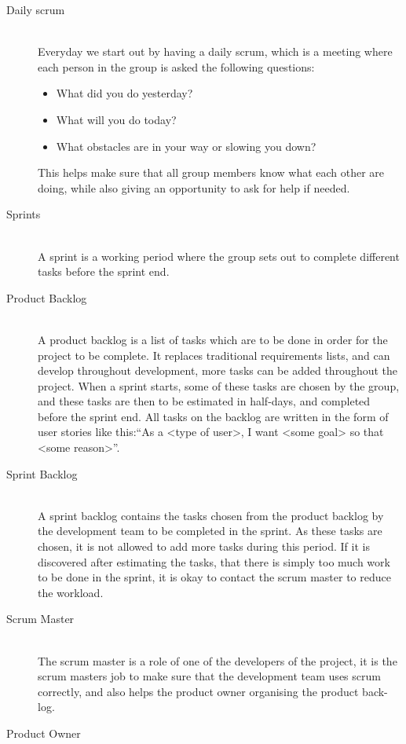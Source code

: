\begin{description}
	\item[Daily scrum] \hfill \\
	Everyday we start out by having a daily scrum, which is a meeting where each person in the group is asked the following questions:
		\begin{itemize}
		    \item What did you do yesterday? 
			\item What will you do today?
			\item What obstacles are in your way or slowing you down?		
		\end{itemize}
		This helps make sure that all group members know what each other are doing, while also giving an opportunity to ask for help if needed.

	\item[Sprints] \hfill \\
	A sprint is a working period where the group sets out to complete different tasks before the sprint end. 
	\item[Product Backlog] \hfill \\
	A product backlog is a list of tasks which are to be done in order for the project to be complete. 
	It replaces traditional requirements lists, and can develop throughout development, more tasks can be added throughout the project.
	When a sprint starts, some of these tasks are chosen by the group, and these tasks are then to be estimated in half-days, and completed before the sprint end.
	All tasks on the backlog are written in the form of user stories like this:``As a <type of user>, I want <some goal> so that <some reason>''.
	\item[Sprint Backlog] \hfill \\
	A sprint backlog contains the tasks chosen from the product backlog by the development team to be completed in the sprint.
	As these tasks are chosen, it is not allowed to add more tasks during this period.
	If it is discovered after estimating the tasks, that there is simply too much work to be done in the sprint, it is okay to contact the scrum master to reduce the workload.
	\item[Scrum Master] \hfill \\
	The scrum master is a role of one of the developers of the project, it is the scrum masters job to make sure that the development team uses scrum correctly, and also helps the product owner organising the product back-log.
	\item[Product Owner] \hfill \\

\end{description}
